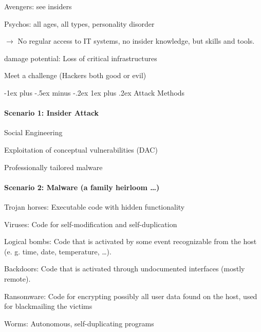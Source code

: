\documentclass[a4paper]{article}
\makeatletter
\renewcommand{\subsubsection}{\@startsection{subsubsection}{3}{0mm}%
                {-1ex plus -.5ex minus -.2ex}%
                {1ex plus .2ex}%
                {\normalfont\small\bfseries}}
\makeatother
\begin{document}
\begin{multicols}{3}
\begin{itemize*}
\begin{itemize*}
\begin{itemize*}
                \item Avengers: see insiders
                \item Psychos: all ages, all types, personality disorder
                \item[$\rightarrow$] No regular access to IT systems, no insider knowledge, but skills and tools.
            \end{itemize*}
            \item damage potential: Loss of critical infrastructures
        \end{itemize*}
        \item Meet a challenge (Hackers both good or evil)
    \end{itemize*}

    \subsubsection{Attack Methods}
    \paragraph{Scenario 1: Insider Attack}
    \begin{itemize*}
        \item Social Engineering
        \item Exploitation of conceptual vulnerabilities (DAC)
        \item Professionally tailored malware
    \end{itemize*}

    \paragraph{Scenario 2: Malware (a family heirloom \dots )}
    \begin{itemize*}
        \item Trojan horses: Executable code with hidden functionality
        \item Viruses: Code for self-modification and self-duplication
        \item Logical bombs: Code that is activated by some event recognizable from the host (e. g. time, date, temperature, \dots ).
        \item Backdoors: Code that is activated through undocumented interfaces (mostly remote).
        \item Ransomware: Code for encrypting possibly all user data found on the host, used for blackmailing the victims
        \item Worms: Autonomous, self-duplicating programs
    \end{itemize*}


\end{multicols}
\end{document}
